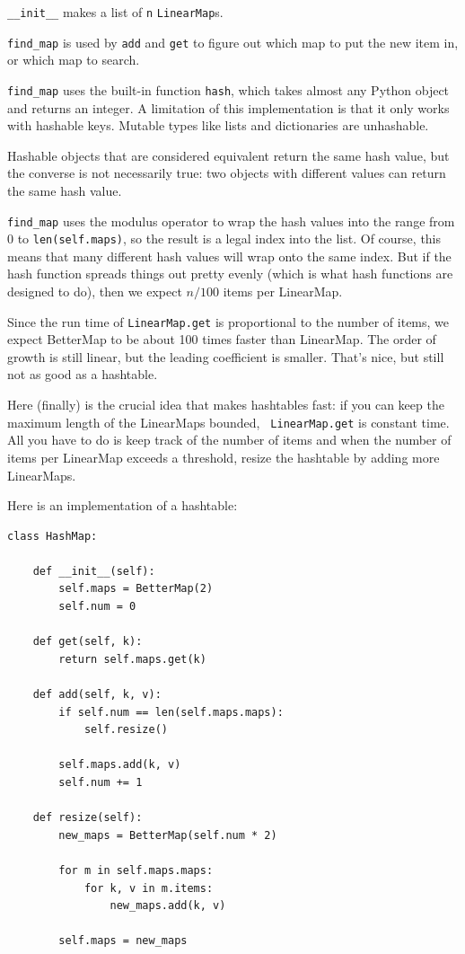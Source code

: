 \documentclass[10pt]{book}
\begin{document}
\verb"__init__" makes a list of {\tt n} {\tt LinearMap}s.

\verb"find_map" is used by
{\tt add} and {\tt get}
to figure out which map to put the
new item in, or which map to search.

\verb"find_map" uses the built-in function {\tt hash}, which takes
almost any Python object and returns an integer.  A limitation of this
implementation is that it only works with hashable keys.  Mutable
types like lists and dictionaries are unhashable.

Hashable objects that are considered equivalent return the same hash
value, but the converse is not necessarily true: two objects with
different values can return the same hash value.

\verb"find_map" uses the modulus operator to wrap the hash values
into the range from 0 to {\tt len(self.maps)}, so the result is a legal
index into the list.  Of course, this means that many different
hash values will wrap onto the same index.  But if the hash function
spreads things out pretty evenly (which is what hash functions
are designed to do), then we expect $n/100$ items per LinearMap.

Since the run time of {\tt LinearMap.get} is proportional to the
number of items, we expect BetterMap to be about 100 times faster
than LinearMap.  The order of growth is still linear, but the
leading coefficient is smaller.  That's nice, but still not
as good as a hashtable.

Here (finally) is the crucial idea that makes hashtables fast: if you
can keep the maximum length of the LinearMaps bounded, {\tt
  LinearMap.get} is constant time.  All you have to do is keep track
of the number of items and when the number of
items per LinearMap exceeds a threshold, resize the hashtable by
adding more LinearMaps.

Here is an implementation of a hashtable:

\begin{verbatim}
class HashMap:

    def __init__(self):
        self.maps = BetterMap(2)
        self.num = 0

    def get(self, k):
        return self.maps.get(k)

    def add(self, k, v):
        if self.num == len(self.maps.maps):
            self.resize()

        self.maps.add(k, v)
        self.num += 1

    def resize(self):
        new_maps = BetterMap(self.num * 2)

        for m in self.maps.maps:
            for k, v in m.items:
                new_maps.add(k, v)

        self.maps = new_maps
\end{verbatim}
\end{document}
